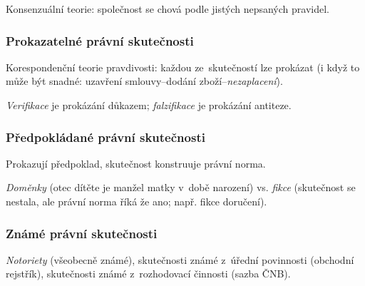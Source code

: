 Konsenzuální teorie: společnost se chová podle jistých nepsaných pravidel.


\subsubsection{Prokazatelné právní skutečnosti}

Korespondenční teorie pravdivosti: každou ze~skutečností lze prokázat (i když to může být snadné: uzavření smlouvy--dodání zboží--\emph{nezaplacení}).

\emph{Verifikace} je prokázání důkazem; \emph{falzifikace} je prokázání antiteze.


\subsubsection{Předpokládané právní skutečnosti}

Prokazují předpoklad, skutečnost konstruuje právní norma.

\emph{Doměnky} (otec dítěte je manžel matky v~době narození) vs. \emph{fikce} (skutečnost se nestala, ale právní norma říká že ano; např. fikce doručení).


\subsubsection{Známé právní skutečnosti}

\emph{Notoriety} (všeobecně známé), skutečnosti známé z~úřední povinnosti (obchodní rejstřík), skutečnosti známé z~rozhodovací činnosti (sazba ČNB).
